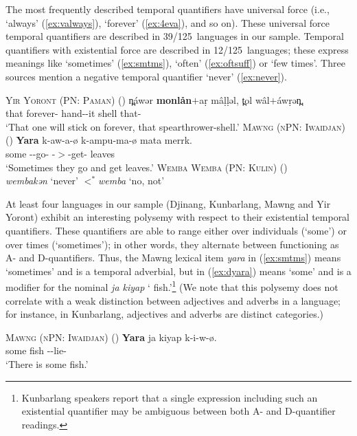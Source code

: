 \documentclass[12pt,egregdoesnotlikesansseriftitles]{scrartcl}
\newcommand{\ofy}{/125} %
\begin{document}
The most frequently described temporal quantifiers have universal force (i.e., `always' (\ref{ex:valways}), `forever' (\ref{ex:4eva}), and so on). These universal force temporal quantifiers are described in 39\ofy \ languages in our sample.%
Temporal quantifiers with existential force are described in 12\ofy \  languages; these express meanings like `sometimes' (\ref{ex:smtms}), `often' (\ref{ex:oftsuff}) or `few times'. Three sources mention a negative temporal quantifier `never' (\ref{ex:never}).
\begin{exe}
  \ex\label{ex:4eva} \textsc{Yir Yoront (PN: Paman)} \hfill (\citealt[343]{alpher73})
  \gll n̪\'awər \textbf{monlån}$+$a\d{r} m\^a\d{l}\d{l}əl, t̪ol w\^al$+$\'aw\d{r}ən̪.\\
  that forever-\Sel{} hand-\Np-it shell that-\Sub\\
  \glt `That one will stick on forever, that spearthrower-shell.'
  \ex\label{ex:smtms} \textsc{Mawng (nPN: Iwaidjan)} \hfill (\citealt{ngaralk})
  \gll \textbf{Yara} k-aw-a-ø k-ampu-ma-ø mata merrk.\\
  some \Prs-\Tpl-go-\Np{} \Prs-\Tpl$>$\Third\Clveg-get-\Np{} \Clveg{} leaves\\
  \glt `Sometimes they go and get leaves.' %
  \ex\label{ex:never} \textsc{Wemba Wemba (PN: Kulin)} \hfill (\citealt[47]{hercus92})\\
  \textit{\charis wembakən} `never' $<^*$\textit{wemba} `no, not'
\end{exe}

At least four languages in our sample (Djinang, Kunbarlang, Mawng and Yir Yoront) exhibit an interesting polysemy with respect to their existential temporal quantifiers. These quantifiers are able to range either over individuals (`some') or over times (`sometimes'); in other words, they alternate between functioning as A- and D-quantifiers.  Thus, the Mawng lexical item \textit{yara} in (\ref{ex:smtms}) means `sometimes' and is a temporal adverbial, but in (\ref{ex:dyara}) means `some' and is a modifier for the nominal \textit{ja kiyap} `\Clm{} fish.'\footnote{Kunbarlang speakers report that a single expression including such an existential quantifier may be ambiguous between both A- and D-quantifier readings.} (We note that this polysemy does not correlate with a weak distinction between adjectives and adverbs in a language; for instance, in Kunbarlang, adjectives and adverbs are distinct categories.)
\begin{exe}
  \ex\label{ex:dyara} \textsc{Mawng (nPN: Iwaidjan)} \hfill (\citealt{ngaralk})
  \gll \textbf{Yara} ja kiyap k-i-w-ø.\\
  some \Clm{} fish \Prs-\Tsg\Clm-lie-\Np\\
  \glt `There is some fish.' %
\end{exe}
\end{document}
